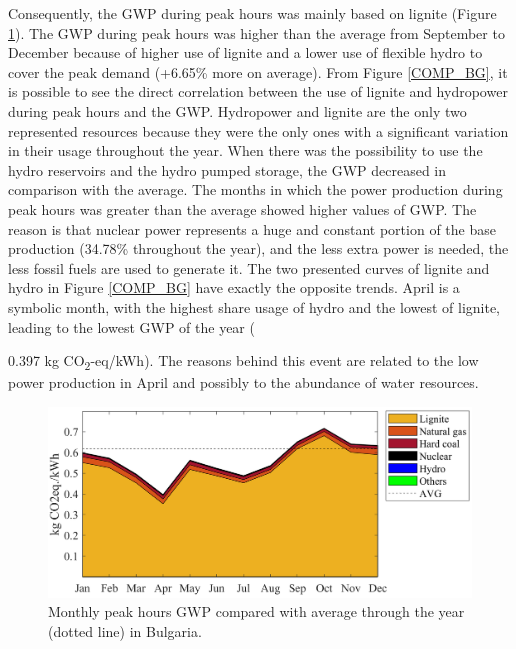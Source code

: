 {Consequently, the GWP during peak hours was mainly based on lignite (Figure \ref{GWP_BG}). The GWP during peak hours was higher than the average from September to December because of higher use of lignite and a lower use of flexible hydro to cover the peak demand {(+6.65\% more on average)}. From Figure  \ref{COMP_BG}, it is possible to see the direct correlation between the use of lignite and hydropower during peak hours and the GWP. Hydropower and lignite are the only two represented resources because they were the only ones with a significant variation in their usage throughout the year. When there was the possibility to use the hydro reservoirs and the hydro pumped storage, the GWP decreased in comparison with the average. The months in which the power production during peak hours was greater than the average showed higher values of GWP. The reason is that  nuclear power represents a huge and constant portion of the base production {(34.78\% throughout the year)}, and the less extra power is needed, the less fossil fuels are used to generate it. The two presented curves of lignite and hydro in Figure \ref{COMP_BG} have exactly the opposite trends. April is a symbolic month, with the highest share usage of hydro and the lowest of lignite,  leading to the lowest GWP of the year ({0.397 kg CO\textsubscript2-eq/kWh). The reasons behind this event are related to the low power production in April and possibly to the abundance of water resources. 
 
\begin{figure}[htbp]
	\centering
	\includegraphics[width=1\textwidth]{ChapterLCA/Images/GWP_plots/Bulgaria_GWP.png}
	\caption{Monthly peak hours GWP compared with average through the year (dotted line) in Bulgaria.}
	\label{GWP_BG}
\end{figure} 

}}
